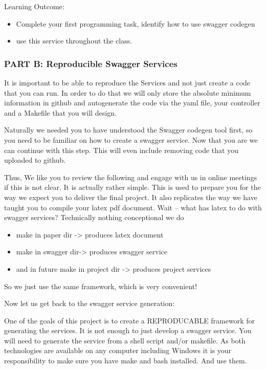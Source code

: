 Learning Outcome:

\begin{itemize}
\item Complete your first programming task, identify how to use
  swagger codegen
\item use this service throughout the class.
\end{itemize}

\subsubsection{PART B: Reproducible Swagger Services}

\begin{exercise}
It is important to be able to reproduce the Services and not just
create a code that you can run. In order to do that we will only store
the absolute minimum information in github and autogenerate the code
via the yaml file, your controller and a Makefile that you will
design.

Naturally we needed you to have understood the Swagger codegen tool
first, so you need to be familiar on how to create a swagger service.
Now that you are we can continue with this step. This will even
include removing code that you uploaded to github.

Thus, We like you to review the following and engage with us in online
meetings if this is not clear. It is actually rather simple. This is
used to prepare you for the way we expect you to deliver the final
project. It also replicates the way we have taught you to compile your
latex pdf document. Wait -- what has latex to do with swagger services?
Technically nothing conceptional we do

 
\begin{itemize}
\item make in paper dir -> produces latex document

\item make in swagger dir-> produces swagger service

\item and in future make in project dir -> produces project services
\end{itemize}
 

So we just use the same framework, which is very convenient!

Now let us get back to the swagger service generation:
 
One of the goals of this project is to create a REPRODUCABLE framework
for generating the services. It is not enough to just develop a
swagger service. You will need to generate the service from a shell
script and/or makefile. As both technologies are available on any
computer including Windows it is your responsibility to make sure you
have make and bash installed. And use them.


\end{exercise}
